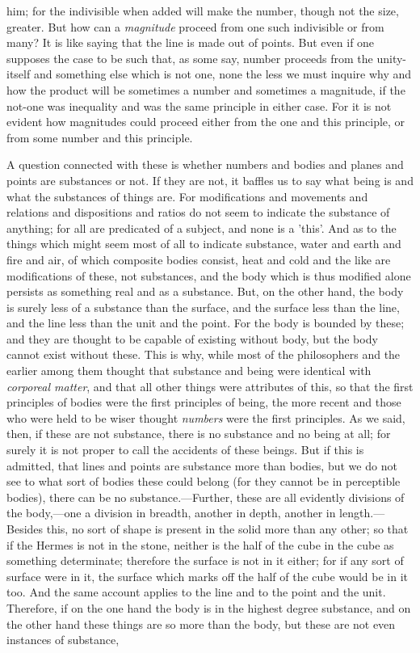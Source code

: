him; for the indivisible when added will make the number, though not the size, greater. But how can a \emph{magnitude} proceed from one such indivisible or from many? It is like saying that the line is made out of points. But even if one supposes the case to be such that, as some say, number proceeds from the unity-itself and something else which is not one, none the less we must inquire why and how the product will be sometimes a number and sometimes a magnitude, if the not-one was inequality and was the same principle in either case. For it is not evident how magnitudes could proceed either from the one and this principle, or from some number and this principle.


A question connected with these is whether numbers and bodies and planes and points are substances or not. If they are not, it baffles us to say what being is and what the substances of things are. For modifications and movements and relations and dispositions and ratios do not seem to indicate the substance of anything; for all are predicated of a subject, and none is a 'this'. And as to the things which might seem most of all to indicate substance, water and earth and fire and air, of which composite bodies consist, heat and cold and the like are modifications of these, not substances, and the body which is thus modified alone persists as something real and as a substance. But, on the other hand, the body is surely less of a substance than the surface, and the surface less than the line, and the line less than the unit and the point. For the body is bounded by these; and they are thought to be capable of existing without body, but the body cannot exist without these. This is why, while most of the philosophers and the earlier among them thought that substance and being were identical with \emph{corporeal matter}, and that all other things were attributes of this, so that the first principles of bodies were the first principles of being, the more recent and those who were held to be wiser thought \emph{numbers} were the first principles. As we said, then, if these are not substance, there is no substance and no being at all; for surely it is not proper to call the accidents of these beings. But if this is admitted, that lines and points are substance more than bodies, but we do not see to what sort of bodies these could belong (for they cannot be in perceptible bodies), there can be no substance.—Further, these are all evidently divisions of the body,—one a division in breadth, another in depth, another in length.—Besides this, no sort of shape is present in the solid more than any other; so that if the Hermes is not in the stone, neither is the half of the cube in the cube as something determinate; therefore the surface is not in it either; for if any sort of surface were in it, the surface which marks off the half of the cube would be in it too. And the same account applies to the line and to the point and the unit. Therefore, if on the one hand the body is in the highest degree substance, and on the other hand these things are so more than the body, but these are not even instances of substance,
